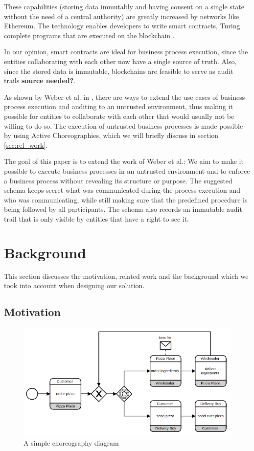 \documentclass[runningheads]{llncs}
\begin{document}
These capabilities (storing data immutably and having consent on a single state without the need of a central authority) are greatly increased by networks like Ethereum. The technology enables developers to write smart contracts, Turing complete programs that are executed on the blockchain \cite{buterin2014next}.

In our opinion, smart contracts are ideal for business process execution, since the entities collaborating with each other now have a single source of truth. Also, since the stored data is immutable, blockchains are feasible to serve as audit trails \textbf{source needed?}.

As shown by Weber et al. in \cite{weber2016untrusted}, there are ways to extend the use cases of business process execution and auditing to an untrusted environment, thus making it possible for entities to collaborate with each other that would usually not be willing to do so. The execution of untrusted business processes is made possible by using Active Choreographies, which we will briefly discuss in section \ref{sec:rel_work}.

The goal of this paper is to extend the work of Weber et al.: We aim to make it possible to execute business processes in an untrusted environment and to enforce a business process without revealing its structure or purpose. The suggested schema keeps secret what was communicated during the process execution and who was communicating, while still making sure that the predefined procedure is being followed by all participants. The schema also records an immutable audit trail that is only visible by entities that have a right to see it. 


\section{Background} \label{sec:background}

This section discusses the motivation, related work and the background which we took into account when designing our solution.


\subsection{Motivation} \label{sec:motivation}


\begin{figure}
    \centering
    \includegraphics[scale=0.6]{bpmn.png}
    \caption{A simple choreography diagram}
    \label{fig:simple_bpmn}
\end{figure}
\end{document}
